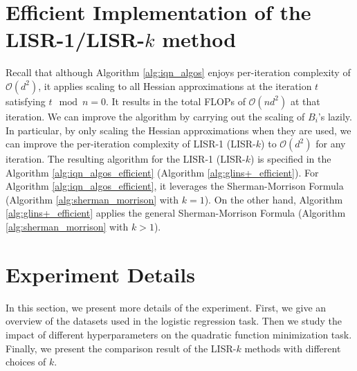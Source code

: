 \documentclass[letterpaper]{article} %
\theoremstyle{plain}
\theoremstyle{definition}
\theoremstyle{remark}
\def\fO{{\mathcal{O}}}
\begin{document}
\section{Efficient Implementation of the LISR-1/LISR-$k$ method}\label{appendix:efficient_impl}
Recall that although Algorithm \ref{alg:iqn_algos} enjoys per-iteration complexity of $\fO(d^2)$, it applies scaling to all Hessian approximations at the iteration $t$ satisfying $t \mod n = 0$.
It results in the total FLOPs of $\fO(n d^2)$ at that iteration.
We can improve the algorithm by carrying out the scaling of $B_i$'s lazily. 
In particular, by only scaling the Hessian approximations when they are used, we can improve the per-iteration complexity of LISR-1 (LISR-$k$) to $\fO(d^2)$ for any iteration. The resulting algorithm for the LISR-1 (LISR-$k$) is specified in the Algorithm \ref{alg:iqn_algos_efficient} (Algorithm \ref{alg:glins+_efficient}). 
For Algorithm \ref{alg:iqn_algos_efficient}, it leverages the Sherman-Morrison Formula (Algorithm \ref{alg:sherman_morrison} with $k=1$). 
On the other hand, Algorithm \ref{alg:glins+_efficient} applies the general Sherman-Morrison Formula (Algorithm \ref{alg:sherman_morrison} with $k > 1$).


\section{Experiment Details}\label{appendix:more_exps}
In this section, we present more details of the experiment. 
First, we give an overview of the datasets used in the logistic regression task. 
Then we study the impact of different hyperparameters on the quadratic function minimization task.
Finally, we present the comparison result of the LISR-$k$ methods with different choices of $k$.
\end{document}
